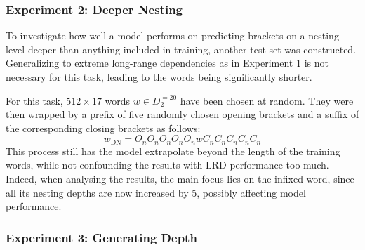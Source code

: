 \subsubsection{Experiment 2: Deeper Nesting}\label{DN}
To investigate how well a model performs on predicting brackets on a nesting level deeper than anything included in training, another test set was constructed. Generalizing to extreme long-range dependencies as in Experiment 1 is not necessary for this task, leading to the words being significantly shorter.

For this task, $512 \times 17$ words $w \in D_{2}^{=20}$ have been chosen at random. They were then wrapped by a prefix of five randomly chosen opening brackets and a suffix of the corresponding closing brackets as follows:
\[
	w_{\text{DN}} = O_{n}O_{n}O_{n}O_{n}O_{n}wC_{n}C_{n}C_{n}C_{n}C_{n}
\]
This process still has the model extrapolate beyond the length of the training words, while not confounding the results with LRD performance too much. Indeed, when analysing the results, the main focus lies on the infixed word, since all its nesting depths are now increased by 5, possibly affecting model performance.

\subsubsection{Experiment 3: Generating Depth}\label{GD}